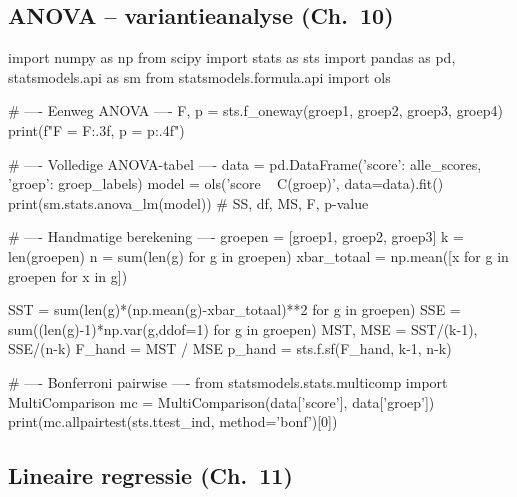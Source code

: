 \documentclass[a4paper,11pt]{article}
\begin{document}
\subsection{ANOVA -- variantieanalyse (Ch.\ 10)}

\begin{pyblock}
import numpy as np
from scipy import stats as sts
import pandas as pd, statsmodels.api as sm
from statsmodels.formula.api import ols

# ---- Eenweg ANOVA ----
F, p = sts.f_oneway(groep1, groep2, groep3, groep4)
print(f"F = {F:.3f}, p = {p:.4f}")

# ---- Volledige ANOVA-tabel ----
data = pd.DataFrame({'score': alle_scores, 'groep': groep_labels})
model = ols('score ~ C(groep)', data=data).fit()
print(sm.stats.anova_lm(model))    # SS, df, MS, F, p-value

# ---- Handmatige berekening ----
groepen = [groep1, groep2, groep3]
k = len(groepen)
n = sum(len(g) for g in groepen)
xbar_totaal = np.mean([x for g in groepen for x in g])

SST = sum(len(g)*(np.mean(g)-xbar_totaal)**2 for g in groepen)
SSE = sum((len(g)-1)*np.var(g,ddof=1) for g in groepen)
MST, MSE = SST/(k-1), SSE/(n-k)
F_hand = MST / MSE
p_hand = sts.f.sf(F_hand, k-1, n-k)

# ---- Bonferroni pairwise ----
from statsmodels.stats.multicomp import MultiComparison
mc = MultiComparison(data['score'], data['groep'])
print(mc.allpairtest(sts.ttest_ind, method='bonf')[0])
\end{pyblock}

\subsection{Lineaire regressie (Ch.\ 11)}
\end{document}
